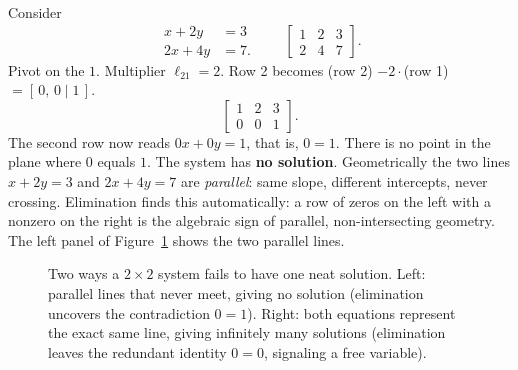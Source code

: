 Consider
\[
\begin{aligned}
x + 2y &= 3\\
2x + 4y &= 7.
\end{aligned}
\qquad
\left[\begin{array}{cc|c}
1 & 2 & 3\\
2 & 4 & 7
\end{array}\right].
\]
Pivot on the $1$. Multiplier $\ell_{21}=2$. Row 2 becomes (row 2) $-2\cdot$(row
1) $= [\,0,\,0\mid 1\,]$.
\[
\left[\begin{array}{cc|c}
1 & 2 & 3\\
0 & 0 & 1
\end{array}\right].
\]
The second row now reads $0x + 0y = 1$, that is, $0 = 1$. There is no point in
the plane where $0$ equals $1$. The system has \textbf{no solution}.
Geometrically the two lines $x+2y=3$ and $2x+4y=7$ are \emph{parallel}: same
slope, different intercepts, never crossing. Elimination finds this
automatically: a row of zeros on the left with a nonzero on the right is the
algebraic sign of parallel, non-intersecting geometry. The left panel of
Figure~\ref{ch07:singular-lines} shows the two parallel lines.

\begin{figure}[H]
\centering
{}
\caption{Two ways a $2\times 2$ system fails to have one neat solution. Left:
parallel lines that never meet, giving no solution (elimination uncovers the contradiction $0=1$). Right:
both equations represent the exact same line, giving infinitely many solutions (elimination leaves the redundant identity $0=0$, signaling a free variable).}
\label{ch07:singular-lines}
\end{figure}

